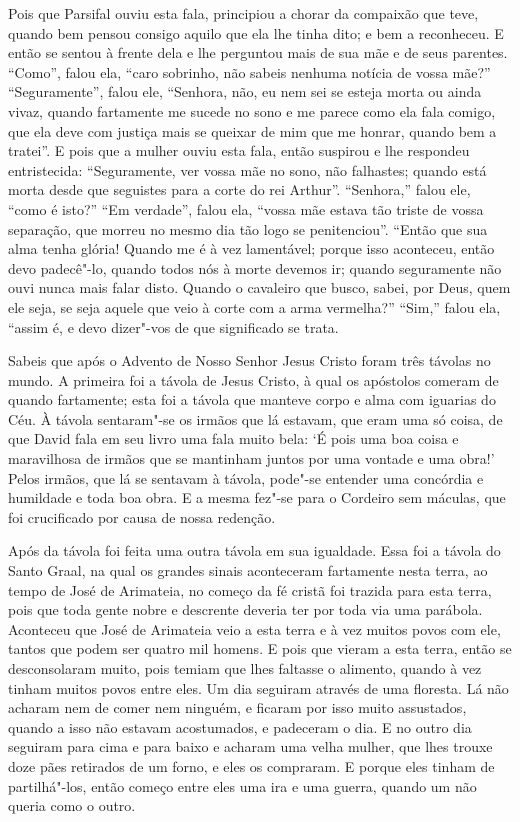 Pois que Parsifal ouviu esta fala, principiou a chorar da compaixão que
teve, quando bem pensou consigo aquilo que ela lhe tinha dito; e bem a
reconheceu. E então se sentou à frente dela e lhe perguntou mais de sua mãe e
de seus parentes. “Como”, falou ela, “caro sobrinho, não sabeis nenhuma notícia
de vossa mãe?” “Seguramente”, falou ele, “Senhora, não, eu nem sei se esteja
morta ou ainda vivaz, quando fartamente me sucede no sono e me parece como ela
fala comigo, que ela deve com justiça mais se queixar de mim que me honrar,
quando bem a tratei”. E pois que a mulher ouviu esta fala, então suspirou e lhe
respondeu entristecida: “Seguramente, ver vossa mãe no sono, não falhastes;
quando está morta desde que seguistes para a corte do rei Arthur”. “Senhora,”
falou ele, “como é isto?” “Em verdade”, falou ela, “vossa mãe estava tão
triste de vossa separação, que morreu no mesmo dia tão logo se penitenciou”.
“Então que sua alma tenha glória! Quando me é à vez lamentável; porque isso
aconteceu, então devo padecê"-lo, quando todos nós à morte devemos ir; quando
seguramente não ouvi nunca mais falar disto. Quando o cavaleiro que busco,
sabei, por Deus, quem ele seja, se seja aquele que veio à corte com a arma
vermelha?” “Sim,” falou ela, “assim é, e devo dizer"-vos de que significado se
trata.

Sabeis que após o Advento de Nosso Senhor Jesus Cristo foram três távolas no
mundo. A primeira foi a távola de Jesus Cristo, à qual os apóstolos comeram de
quando fartamente; esta foi a távola que manteve corpo e alma com iguarias do
Céu. À távola sentaram"-se os irmãos que lá estavam, que eram uma só coisa, de
que David fala em seu livro uma fala muito bela: ‘É pois uma boa coisa e
maravilhosa de irmãos que se mantinham juntos por uma vontade e uma obra!’
Pelos irmãos, que lá se sentavam à távola, pode"-se entender uma concórdia e
humildade e toda boa obra. E a mesma fez"-se para o Cordeiro sem máculas, que
foi crucificado por causa de nossa redenção. 

Após da távola foi feita uma outra távola em sua igualdade. Essa foi a
távola do Santo Graal, na qual os grandes sinais aconteceram fartamente nesta
terra, ao tempo de José de Arimateia, no começo da fé cristã foi trazida para
esta terra, pois que toda gente nobre e descrente deveria ter por toda via uma
parábola. Aconteceu que José de Arimateia veio a esta terra e à vez muitos
povos com ele, tantos que podem ser quatro mil homens. E pois que vieram a esta
terra, então se desconsolaram muito, pois temiam que lhes faltasse o alimento,
quando à vez tinham muitos povos entre eles. Um dia seguiram através de uma
floresta. Lá não acharam nem de comer nem ninguém, e ficaram por isso muito
assustados, quando a isso não estavam acostumados, e padeceram o dia. E no
outro dia seguiram para cima e para baixo e acharam uma velha mulher, que lhes
trouxe doze pães retirados de um forno, e eles os compraram. E porque eles
tinham de partilhá"-los,  então começo entre eles uma ira e uma guerra, quando
um não queria como o outro.

